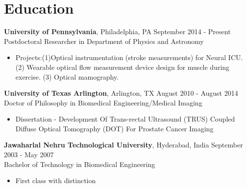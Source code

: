 \documentclass{my_cv}
\begin{document}

\section{Education}
\begin{flushleft}  
\textbf{University of Pennsylvania}, Philadelphia, PA  \hfill September 2014 - Present \\ 
Postdoctoral Researcher in Department of Physics and Astronomy \\ 
\vspace{-2mm}
\begin{itemize}\itemsep -5mm
\item Projects:(1)Optical instrumentation (stroke measurements) for Neural ICU. (2) Wearable optical flow measurement device design for muscle during exercise. (3) Optical mamography.  
\end{itemize}
\vspace{-2.5mm}
\textbf{University of Texas Arlington}, Arlington, TX \hfill August 2010 - August 2014 \\ 
Doctor of Philosophy in Biomedical Engineering/Medical Imaging \\
\vspace{-2mm}
\begin{itemize}\itemsep -2pt
\item Dissertation -  Development Of Trans-rectal Ultrasound (TRUS) Coupled Diffuse Optical Tomography (DOT) For Prostate Cancer Imaging
\end{itemize}
 \vspace{-2.5mm}
\textbf{Jawaharlal Nehru Technological University}, Hyderabad, India \hfill September 2003 - May 2007\\
Bachelor of Technology in Biomedical Engineering \\ 
\vspace{-2mm}
\begin{itemize}
\item First class with distinction
\end{itemize}
\end{flushleft}  
 
\vspace{-7mm}%
\end{document}

